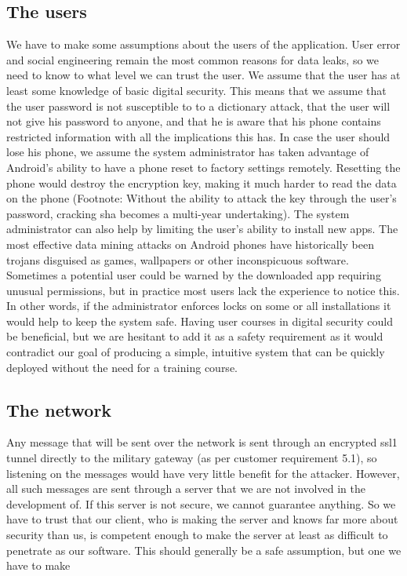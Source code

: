 \subsection{The users}
We have to make some assumptions about the users of the application. User error and social engineering remain the most common reasons for data leaks, so we need to know to what level we can trust the user.
\newline
\newline
We assume that the user has at least some knowledge of basic digital security. This means that we assume that the user password is not susceptible to to a dictionary attack, that the user will not give his password to anyone, and that he is aware that his phone contains restricted information with all the implications this has. 
\newline
\newline
In case the user should lose his phone, we assume the system administrator has taken advantage of Android’s ability to have a phone reset to factory settings remotely. Resetting the phone would destroy the encryption key, making it much harder to read the data on the phone (Footnote: Without the ability to attack the key through the user’s password, cracking \gls{sha} becomes a multi-year undertaking).
\newline
\newline
The system administrator can also help by limiting the user’s ability to install new apps. The most effective data mining attacks on Android phones have historically been trojans disguised as games, wallpapers or other inconspicuous software. Sometimes a potential user could be warned by the downloaded app requiring unusual permissions, but in practice most users lack the experience to notice this. In other words, if the administrator enforces locks on some or all installations it would help to keep the system safe.
\newline
\newline
Having user courses in digital security could be beneficial, but we are hesitant to add it as a safety requirement as it would contradict our goal of producing a simple, intuitive system that can be quickly deployed without the need for a training course. 

\newpage

\subsection{The network}
Any message that will be sent over the network is sent through an encrypted \gls{ssl1} tunnel directly to the military gateway (as per customer requirement 5.1), so listening on the messages would have very little benefit for the attacker. However, all such messages are sent through a server that we are not involved in the development of. If this server is not secure, we cannot guarantee anything. So we have to trust that our client, who is making the server and knows far more about security than us, is competent enough to make the server at least as difficult to penetrate as our software. This should generally be a safe assumption, but one we have to make

